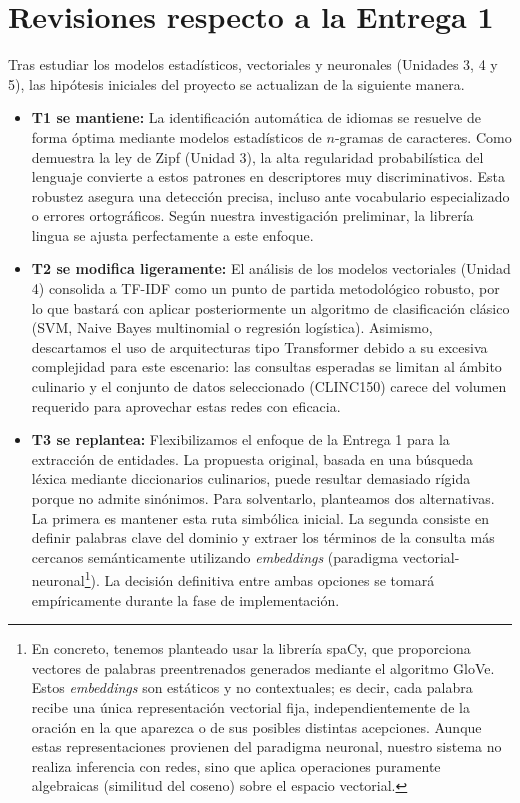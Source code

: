 \documentclass[11pt,a4paper,twoside]{article}
\theoremstyle{definition}
\numberwithin{equation}{section}
\begin{document}
\section{Revisiones respecto a la Entrega 1} \label{sec6}
Tras estudiar los modelos estadísticos, vectoriales y neuronales (Unidades 3, 4 y 5), las hipótesis iniciales del proyecto se actualizan de la siguiente manera.
\begin{itemize}
	\item \textbf{T1 se mantiene:} La identificación automática de idiomas se resuelve de forma óptima mediante modelos estadísticos de $n$-gramas de caracteres. Como demuestra la ley de Zipf (Unidad 3), la alta regularidad probabilística del lenguaje convierte a estos patrones en descriptores muy discriminativos. Esta robustez asegura una detección precisa, incluso ante vocabulario especializado o errores ortográficos. Según nuestra investigación preliminar, la librería lingua se ajusta perfectamente a este enfoque.
	
	\item \textbf{T2 se modifica ligeramente:} El análisis de los modelos vectoriales (Unidad 4) consolida a TF-IDF como un punto de partida metodológico robusto, por lo que bastará con aplicar posteriormente un algoritmo de clasificación clásico (SVM, Naive Bayes multinomial o regresión logística). Asimismo, descartamos el uso de arquitecturas tipo Transformer debido a su excesiva complejidad para este escenario: las consultas esperadas se limitan al ámbito culinario y el conjunto de datos seleccionado (CLINC150) carece del volumen requerido para aprovechar estas redes con eficacia.
	
	\item \textbf{T3 se replantea:} Flexibilizamos el enfoque de la Entrega 1 para la extracción de entidades. La propuesta original, basada en una búsqueda léxica mediante diccionarios culinarios, puede resultar demasiado rígida porque no admite sinónimos. Para solventarlo, planteamos dos alternativas. La primera es mantener esta ruta simbólica inicial. La segunda consiste en definir palabras clave del dominio y extraer los términos de la consulta más cercanos semánticamente utilizando \textit{embeddings} (paradigma vectorial-neuronal\footnote{En concreto, tenemos planteado usar la librería spaCy, que proporciona vectores de palabras preentrenados generados mediante el algoritmo GloVe. Estos \textit{embeddings} son estáticos y no contextuales; es decir, cada palabra recibe una única representación vectorial fija, independientemente de la oración en la que aparezca o de sus posibles distintas acepciones. Aunque estas representaciones provienen del paradigma neuronal, nuestro sistema no realiza inferencia con redes, sino que aplica operaciones puramente algebraicas (similitud del coseno) sobre el espacio vectorial.}). La decisión definitiva entre ambas opciones se tomará empíricamente durante la fase de implementación.
	

\end{itemize}
\end{document}
